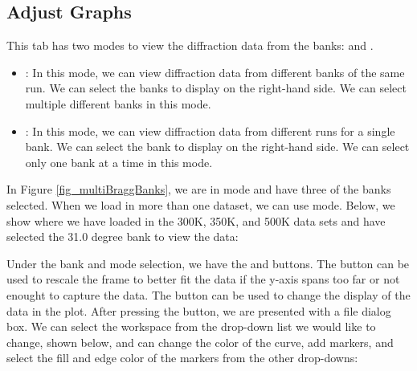 \subsection{Adjust Graphs}

This tab has two modes to view the diffraction data from the banks:  and . 

\begin{itemize}

\item {}: In this mode, we can view diffraction data from different banks of the same run. We can select the banks to display on the right-hand side. We can select multiple different banks in this mode.

\item {}: In this mode, we can view diffraction data from different runs for a single bank. We can select the bank to display on the right-hand side. We can select only one bank at a time in this mode.

\end{itemize}

In Figure \ref{fig_multiBraggBanks}, we are in  mode and have three of the banks selected. When we load in more than one dataset, we can use  mode. Below, we show where we have loaded in the 300K, 350K, and 500K data sets and have selected the 31.0 degree bank to view the data:

\noindent{} \label{fig_multiBraggBanks}

Under the bank and mode selection, we have the  and  buttons. The  button can be used to rescale the frame to better fit the data if the y-axis spans too far or not enought to capture the data. The  button can be used to change the display of the data in the plot. After pressing the  button, we are presented with a file dialog box. We can select the workspace from the drop-down list we would like to change, shown below, and can change the color of the curve, add markers, and select the fill and edge color of the markers from the other drop-downs: 


